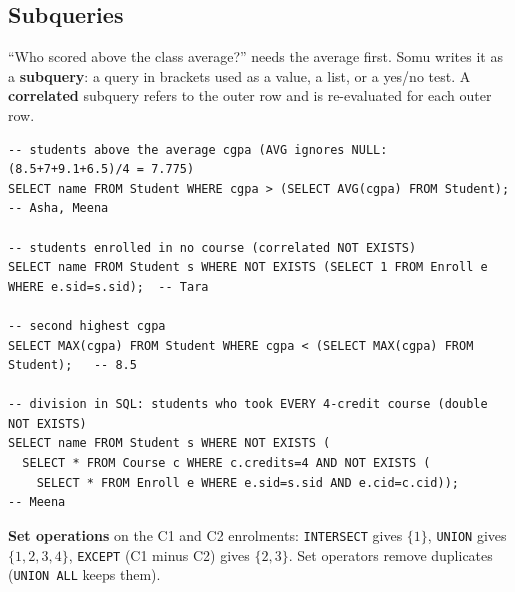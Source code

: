 \documentclass[11pt,a4paper]{article}
\begin{document}
\subsection{Subqueries}
\begin{story}
``Who scored above the class average?'' needs the average first. Somu writes it as a \textbf{subquery}: a query in brackets used as a value, a list, or a yes/no test. A \textbf{correlated} subquery refers to the outer row and is re-evaluated for each outer row.
\end{story}
\begin{lstlisting}[style=sql]
-- students above the average cgpa (AVG ignores NULL: (8.5+7+9.1+6.5)/4 = 7.775)
SELECT name FROM Student WHERE cgpa > (SELECT AVG(cgpa) FROM Student);   -- Asha, Meena

-- students enrolled in no course (correlated NOT EXISTS)
SELECT name FROM Student s WHERE NOT EXISTS (SELECT 1 FROM Enroll e WHERE e.sid=s.sid);  -- Tara

-- second highest cgpa
SELECT MAX(cgpa) FROM Student WHERE cgpa < (SELECT MAX(cgpa) FROM Student);   -- 8.5

-- division in SQL: students who took EVERY 4-credit course (double NOT EXISTS)
SELECT name FROM Student s WHERE NOT EXISTS (
  SELECT * FROM Course c WHERE c.credits=4 AND NOT EXISTS (
    SELECT * FROM Enroll e WHERE e.sid=s.sid AND e.cid=c.cid));          -- Meena
\end{lstlisting}
\textbf{Set operations} on the C1 and C2 enrolments: \texttt{INTERSECT} gives $\{1\}$, \texttt{UNION} gives $\{1,2,3,4\}$, \texttt{EXCEPT} (C1 minus C2) gives $\{2,3\}$. Set operators remove duplicates (\texttt{UNION ALL} keeps them).
\end{document}
